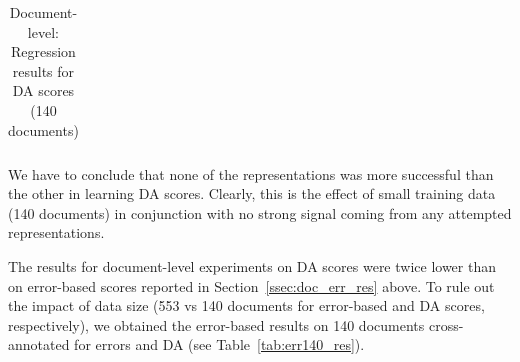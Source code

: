\begin{table}[H]
\begin{tabular}{l|cl|cl}
		\bottomrule
	\end{tabular}
\caption{\label{tab:da_doc_res}Document-level: Regression results for DA scores (140 documents)}
\end{table}

We have to conclude that none of the representations was more successful than the other in learning DA scores. Clearly, this is the effect of small training data (140 documents) in conjunction with no strong signal coming from any attempted representations. 

The results for document-level experiments on DA scores were twice lower than on error-based scores reported in Section~\ref{ssec:doc_err_res} above. To rule out the impact of data size (553 vs 140 documents for error-based and DA scores, respectively), we obtained the error-based results on 140 documents cross-annotated for errors and DA (see Table~\ref{tab:err140_res}).


